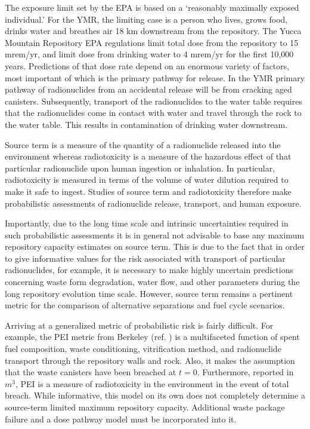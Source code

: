 The exposure limit set by the \gls{EPA} is based on a `reasonably maximally 
exposed individual.' For the \gls{YMR}, the limiting case is a person who lives, 
grows food, drinks water and breathes air 18 km downstream from the repository. 
The Yucca Mountain Repository \gls{EPA} regulations limit total dose from the 
repository to 15 mrem/yr, and limit dose from drinking water to 4 mrem/yr for 
the first 10,000 years. 
Predictions of that dose rate depend on an enormous variety of factors, most 
important of which is the primary pathway for release. In the \gls{YMR} primary 
pathway of radionuclides from an accidental release will be from cracking aged 
canisters. Subsequently, transport of the radionuclides to the water table 
requires that the radionuclides come in contact with water and travel through 
the rock to the water table. This results in contamination of drinking water 
downstream.  

Source term is a measure of the quantity of a radionuclide released into the 
environment whereas radiotoxicity is a measure of the hazardous effect of that 
particular radionuclide upon human ingestion or inhalation.  In particular, 
radiotoxicity is measured in terms of the volume of water dilution required to 
make it safe to ingest. Studies of source term and radiotoxicity therefore make 
probabilistic assessments of radionuclide release, transport, and human 
exposure.  

Importantly, due to the long time scale and intrinsic uncertainties required in 
such probabilistic assessments it is in general not advisable to base any 
maximum repository capacity estimates on source term. This is due to the fact 
that in order to give informative values for the risk associated with transport of 
particular radionuclides, for example, it is necessary to make highly uncertain  
predictions concerning waste form degradation, water flow, and other parameters 
during the long repository evolution time scale.  However, source term remains a 
pertinent metric for the comparison of alternative separations and fuel cycle
scenarios.


Arriving at a generalized metric of probabilistic risk is fairly difficult. For 
example, the \gls{PEI} metric from Berkeley (ref.  
\cite{bouvier_comparison_2007}) is a multifaceted function of spent fuel 
composition, waste conditioning, vitrification method, and radionuclide 
transport through the repository walls and rock.  Also, it makes the assumption 
that the waste canisters have been breached at $t=0$. Furthermore, reported in 
$m^3$, PEI is a measure of radiotoxicity in the environment in the event of 
total breach. While informative, this model on its own does not completely 
determine a source-term limited maximum repository capacity.  Additional waste 
package failure and a dose pathway model must be incorporated into it.


